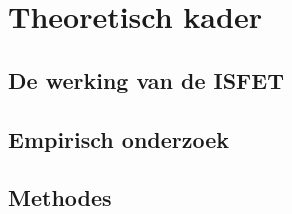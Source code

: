 \section{Theoretisch kader}

\subsection{De werking van de ISFET}\label{sec:werkingISFET}


\subsection{Empirisch onderzoek}
\subsection{Methodes}



